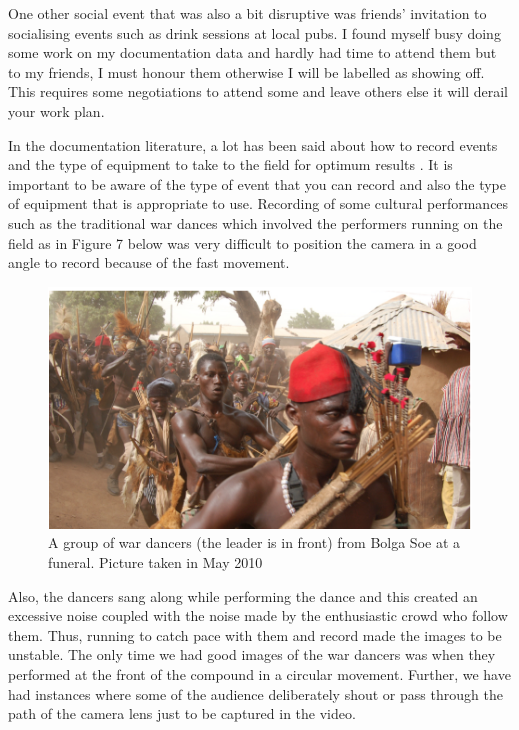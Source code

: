 \documentclass[output=paper,colorlinks,citecolor=brown]{langscibook}
\begin{document}
One other social event that was also a bit disruptive was friends’ invitation to socialising events such as drink sessions at local pubs. I found myself busy doing some work on my documentation data and hardly had time to attend them but to my friends, I must honour them otherwise I will be labelled as showing off.  This requires some negotiations to attend some and leave others else it will derail your work plan.

In the documentation literature, a lot has been said about how to record events and the type of equipment to take to the field for optimum results \citep{Bowern2015, Woodbury2003, AustinGrenoble2007}.  It is important to be aware of the type of event that you can record and also the type of equipment that is appropriate to use. Recording of some cultural performances such as the traditional war dances which involved the performers running on the field as in Figure 7 below was very difficult to position the camera in a good angle to record because of the fast movement.  

\begin{figure}
\includegraphics[width=\textwidth]{figures/bolga_soe.png}
\caption{A group of war dancers (the leader is in front) from Bolga Soe at a funeral. Picture taken in May 2010}
\end{figure}


Also, the dancers sang along while performing the dance and this created an excessive noise coupled with the noise made by the enthusiastic crowd who follow them. Thus, running to catch pace with them and record made the images to be unstable. The only time we had good images of the war dancers was when they performed at the front of the compound in a circular movement. Further, we have had instances where some of the audience deliberately shout or pass through the path of the camera lens just to be captured in the video.
\end{document}
